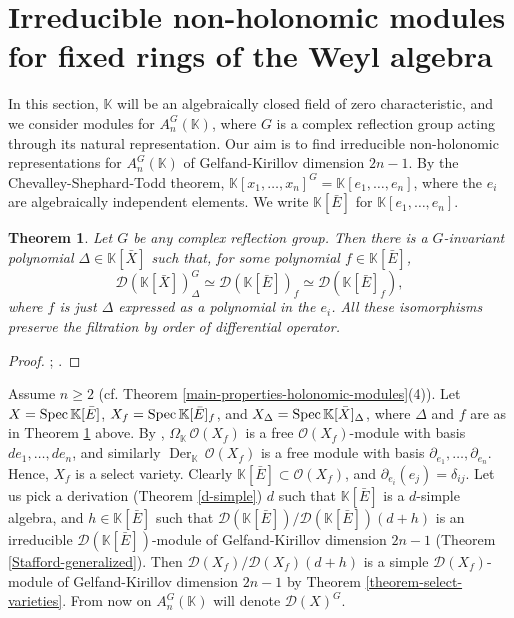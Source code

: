 \documentclass[12pt, a4paper]{amsart}
\newtheorem{theorem}{Theorem}[section]
\newcommand{\Invar}{A_n^G(\mathbb{K})}           %
\newcommand{\Spec}{{\rm{Spec}}}
\newcommand{\into}{\,\,\hookrightarrow\,\,}
\def\D{\mathcal D}
\def\KK{\mathbb K}
\begin{document}
\section{Irreducible non-holonomic modules for fixed rings of the Weyl algebra}
In this section, $\KK$ will be an algebraically closed field of zero characteristic, and we consider modules for $\Invar$, where $G$ is a complex reflection group acting through its natural representation. Our aim is to find irreducible non-holonomic representations for $\Invar$ of Gelfand-Kirillov dimension $2n-1$.
By the Chevalley-Shephard-Todd theorem, $\KK[x_1, \ldots, x_n]^G=\KK[e_1,\ldots,e_n]$, where the $e_i$ are algebraically independent elements. We write $\KK[\bar{E}]$ for $\KK[e_1,\ldots,e_n]$.
\begin{theorem}\label{EFS}
    Let $G$ be any complex reflection group. Then there is a $G$-invariant polynomial $\Delta \in \KK[\bar{X}]$ such that, for some polynomial $f \in \KK[\bar{E}]$,
    \[ \D(\KK[\bar{X}])^G_\Delta \simeq \D(\KK[\bar{E}])_f \simeq \mathcal{D}(\KK[\bar{E}]_f), \] where $f$ is just $\Delta$ expressed as a polynomial in the $e_i$. All these isomorphisms preserve the filtration by order of differential operator.
\end{theorem}
\begin{proof}
    \cite[Proposition 5.1, 5.2, and 5.7]{FS}; \cite[Proof of Theorem 2]{EFOS}.
\end{proof}
Assume $n \geq 2$ (cf. Theorem \ref{main-properties-holonomic-modules}(4)).
Let $X=\Spec \,\KK[\bar{E}]$, $X_f=\Spec \, \KK[\bar{E}]_f$, and $X_\Delta = \Spec \, \KK[\bar{X}]_\Delta$, where $\Delta$ and $f$ are as in Theorem \ref{EFS} above.
By \cite[15.1.24]{McConnell}, $\Omega_\KK \,\mathcal{O}(X_f)$ is a free $\mathcal{O}(X_f)$-module with basis $de_1, \ldots, de_n$, and similarly $\operatorname{Der}_\KK \, \mathcal{O}(X_f)$ is a free module with basis $\partial_{e_1}, \ldots, \partial_{e_n}$. Hence, $X_f$ is a select variety. Clearly $\KK[\bar{E}] \subset \mathcal{O}(X_f)$, and $\partial_{e_i}(e_j)=\delta_{ij}$.
Let us pick a derivation (Theorem \ref{d-simple}) $d$ such that $\KK[\bar{E}]$ is a $d$-simple algebra, and $h \in \KK[\bar{E}]$ such that $\D(\KK[\bar{E}])/\D(\KK[\bar{E}])(d+h)$ is an irreducible $\D(\KK[\bar{E}])$-module of Gelfand-Kirillov dimension $2n-1$ (Theorem \ref{Stafford-generalized}).
Then $\D(X_f)/\D(X_f)(d+h)$ is a simple $\D(X_f)$-module of Gelfand-Kirillov dimension $2n-1$ by Theorem \ref{theorem-select-varieties}.
From now on $\Invar$ will denote $\D(X)^G$.
\end{document}
